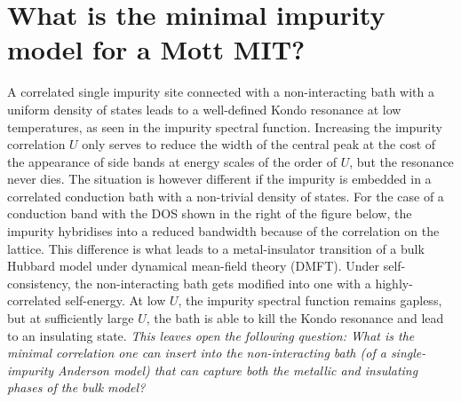 \documentclass{report}
\numberwithin{equation}{section}
\begin{document}


\section{What is the minimal impurity model for a Mott MIT?}
A correlated single impurity site connected with a non-interacting bath with a uniform density of states leads to a well-defined Kondo resonance at low temperatures, as seen in the impurity spectral function. Increasing the impurity correlation \(U\) only serves to reduce the width of the central peak at the cost of the appearance of side bands at energy scales of the order of \(U\), but the resonance never dies. The situation is however different if the impurity is embedded in a correlated conduction bath with a non-trivial density of states. For the case of a conduction band with the DOS shown in the right of the figure below, the impurity hybridises into a reduced bandwidth because of the correlation on the lattice. This difference is what leads to a metal-insulator transition of a bulk Hubbard model under dynamical mean-field theory (DMFT). Under self-consistency, the non-interacting bath gets modified into one with a highly-correlated self-energy. At low \(U\), the impurity spectral function remains gapless, but at sufficiently large \(U\), the bath is able to kill the Kondo resonance and lead to an insulating state. \textit{This leaves open the following question: What is the minimal correlation one can insert into the non-interacting bath (of a single-impurity Anderson model) that can capture both the metallic and insulating phases of the bulk model?}
\cite{held_2013}
\end{document}
